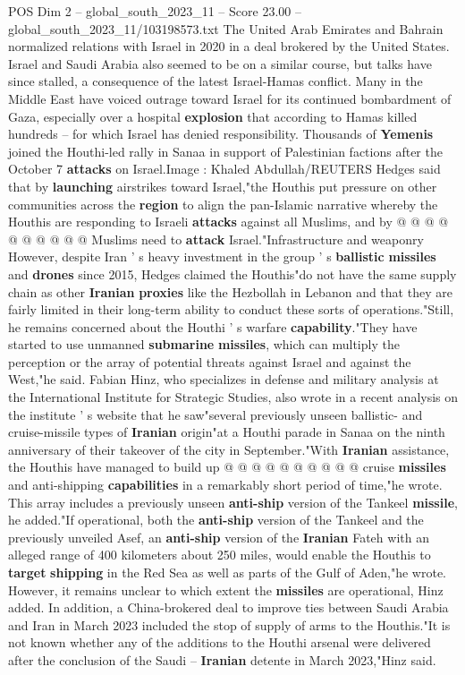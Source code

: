 \begin{textsample}{POS Dim 2 – global\_south\_2023\_11 – Score 23.00 – global\_south\_2023\_11/103198573.txt}
The United Arab Emirates and Bahrain normalized relations with Israel in 2020 in a deal brokered by the United States.
Israel and Saudi Arabia also seemed to be on a similar course, but talks have since stalled, a consequence of the latest Israel-Hamas conflict.
Many in the Middle East have voiced outrage toward Israel for its continued bombardment of Gaza, especially over a hospital \textbf{explosion} that according to Hamas killed hundreds -- for which Israel has denied responsibility.
Thousands of \textbf{Yemenis} joined the Houthi-led rally in Sanaa in support of Palestinian factions after the October 7 \textbf{attacks} on Israel.Image : Khaled Abdullah/REUTERS Hedges said that by \textbf{launching} airstrikes toward Israel,"the Houthis put pressure on other communities across the \textbf{region} to align the pan-Islamic narrative whereby the Houthis are responding to Israeli \textbf{attacks} against all Muslims, and by @ @ @ @ @ @ @ @ @ @ Muslims need to \textbf{attack} Israel."Infrastructure and weaponry However, despite Iran ' s heavy investment in the group ' s \textbf{ballistic} \textbf{missiles} and \textbf{drones} since 2015, Hedges claimed the Houthis"do not have the same supply chain as other \textbf{Iranian} \textbf{proxies} like the Hezbollah in Lebanon and that they are fairly limited in their long-term ability to conduct these sorts of operations."Still, he remains concerned about the Houthi ' s warfare \textbf{capability}."They have started to use unmanned \textbf{submarine} \textbf{missiles}, which can multiply the perception or the array of potential threats against Israel and against the West,"he said.
Fabian Hinz, who specializes in defense and military analysis at the International Institute for Strategic Studies, also wrote in a recent analysis on the institute ' s website that he saw"several previously unseen ballistic- and cruise-missile types of \textbf{Iranian} origin"at a Houthi parade in Sanaa on the ninth anniversary of their takeover of the city in September."With \textbf{Iranian} assistance, the Houthis have managed to build up @ @ @ @ @ @ @ @ @ @ cruise \textbf{missiles} and anti-shipping \textbf{capabilities} in a remarkably short period of time,"he wrote.
This array includes a previously unseen \textbf{anti-ship} version of the Tankeel \textbf{missile}, he added."If operational, both the \textbf{anti-ship} version of the Tankeel and the previously unveiled Asef, an \textbf{anti-ship} version of the \textbf{Iranian} Fateh with an alleged range of 400 kilometers about 250 miles, would enable the Houthis to \textbf{target} \textbf{shipping} in the Red Sea as well as parts of the Gulf of Aden,"he wrote.
However, it remains unclear to which extent the \textbf{missiles} are operational, Hinz added.
In addition, a China-brokered deal to improve ties between Saudi Arabia and Iran in March 2023 included the stop of supply of arms to the Houthis."It is not known whether any of the additions to the Houthi arsenal were delivered after the conclusion of the Saudi -- \textbf{Iranian} detente in March 2023,"Hinz said.


\end{textsample}

